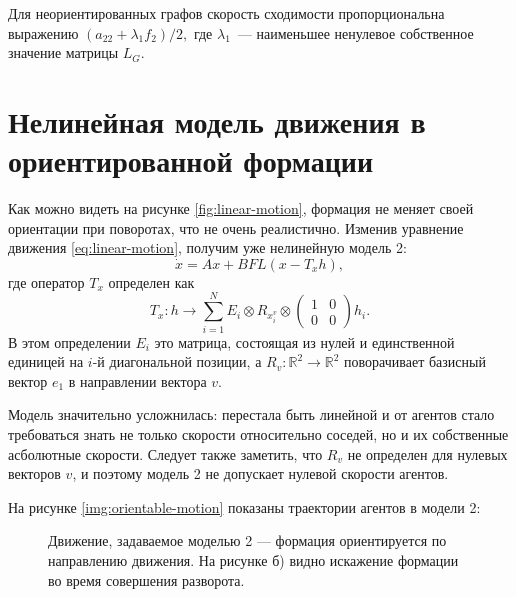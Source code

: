 \begin{theorem}
Для неориентированных графов скорость сходимости пропорциональна выражению 
$(a_22+\lambda_1 f_2)/2,$ где $\lambda_1$~--- наименьшее ненулевое собственное значение матрицы $L_G$.
\end{theorem}

\section{Нелинейная модель движения в ориентированной формации}
Как можно видеть на рисунке \ref{fig:linear-motion}, формация не меняет своей ориентации при поворотах, что не очень реалистично. Изменив уравнение движения \ref{eq:linear-motion}, получим уже нелинейную модель 2:
\begin{equation}
\dot{x}=Ax+BFL(x-T_x h),
\label{eq:orientable-motion}
\end{equation}
где оператор $T_x$ определен как
\begin{equation}
T_x:h\rightarrow \sum^N_{i=1}E_i\otimes R_{x^v_i}\otimes
\left( 
\begin{array}{cc}
1 & 0 \\
0 & 0 \end{array} \right) h_i.
\end{equation}
В этом определении $E_i$ это матрица, состоящая из нулей и единственной единицей на $i$-й диагональной позиции, а $R_v:\mathbb{R}^2\rightarrow\mathbb{R}^2$ поворачивает базисный вектор $e_1$ в направлении вектора $v$.

Модель значительно усложнилась: перестала быть линейной и от агентов стало требоваться знать не только скорости относительно соседей, но и их собственные асболютные скорости. Следует также заметить, что $R_v$ не определен для нулевых векторов $v$, и поэтому модель 2 не допускает нулевой скорости агентов.

На рисунке \ref{img:orientable-motion} показаны траектории агентов в модели 2:

\begin{figure}[h]
  \begin{minipage}[h]{0.45\linewidth}
  \end{minipage}
  \hfill
  \begin{minipage}[h]{0.45\linewidth}
  \end{minipage}
  \caption{Движение, задаваемое моделью 2 --- формация ориентируется по направлению движения. На рисунке б) видно искажение формации во время совершения разворота.}
\label{fig:orientable-motion}
\end{figure}

